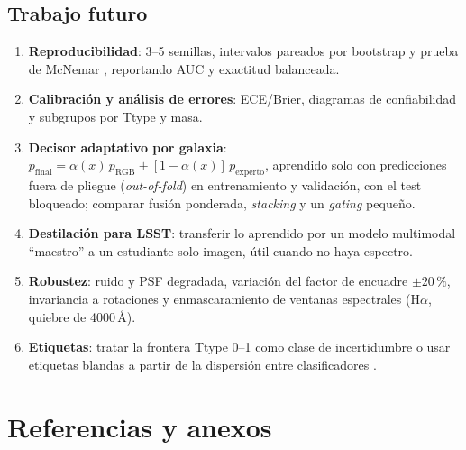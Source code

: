 \subsection{Trabajo futuro}
\begin{enumerate}
  \item \textbf{Reproducibilidad}: 3--5 semillas, intervalos pareados por bootstrap y prueba de McNemar \citep{dietterich1998}, reportando AUC y exactitud balanceada.
  \item \textbf{Calibración y análisis de errores}: ECE/Brier, diagramas de confiabilidad \citep{guo2017} y subgrupos por Ttype y masa.
  \item \textbf{Decisor adaptativo por galaxia}: $p_{\text{final}} = \alpha(x)\,p_{\text{RGB}} + [1-\alpha(x)]\,p_{\text{experto}}$, aprendido solo con predicciones fuera de pliegue (\emph{out-of-fold}) en entrenamiento y validación, con el test bloqueado; comparar fusión ponderada, \emph{stacking} y un \emph{gating} pequeño.
  \item \textbf{Destilación para LSST}: transferir lo aprendido por un modelo multimodal ``maestro'' a un estudiante solo-imagen, útil cuando no haya espectro.
  \item \textbf{Robustez}: ruido y PSF degradada, variación del factor de encuadre $\pm20\,\%$, invariancia a rotaciones y enmascaramiento de ventanas espectrales (H$\alpha$, quiebre de 4000\,\AA).
  \item \textbf{Etiquetas}: tratar la frontera Ttype 0--1 como clase de incertidumbre o usar etiquetas blandas a partir de la dispersión entre clasificadores \citep{walmsley2022}.
\end{enumerate}

\section{Referencias y anexos}
\label{sec:referencias}

